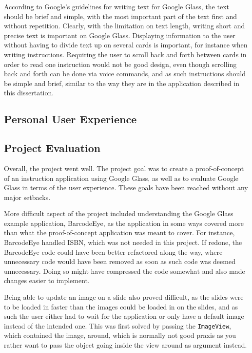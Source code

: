 According to Google's guidelines for writing text for Google Glass, the text should be brief and simple, with the most important part of the text first and without repetition. Clearly, with the limitation on text length, writing short and precise text is important on Google Glass. Displaying information to the user without having to divide text up on several cards is important, for instance when writing instructions. Requiring the user to scroll back and forth between cards in order to read one instruction would not be good design, even though scrolling back and forth can be done via voice commands, and as such instructions should be simple and brief, similar to the way they are in the application described in this dissertation.

\subsection{Personal User Experience}
\label{subsec:personalexperience}


\subsection{Project Evaluation}
Overall, the project went well. The project goal was to create a proof-of-concept of an instruction application using Google Glass, as well as to evaluate Google Glass in terms of the user experience. These goals have been reached  without any major setbacks. 

More difficult aspect of the project included understanding the Google Glass example application, BarcodeEye, as the application in some ways covered more than what the proof-of-concept application was meant to cover. For instance, BarcodeEye handled ISBN, which was not needed in this project. If redone, the BarcodeEye code could have been better refactored along the way, where unnecessary code would have been removed as soon as such code was deemed unnecessary. Doing so might have compressed the code somewhat and also made changes easier to implement. 

Being able to update an image on a slide also proved difficult, as the slides were to be loaded in faster than the images could be loaded in on the slides, and as such the user either had to wait for the application or only have a default image instead of the intended one. This was first solved by passing the \texttt{ImageView}, which contained the image, around, which is normally not good praxis as you rather want to pass the object going inside the view around as argument instead.

